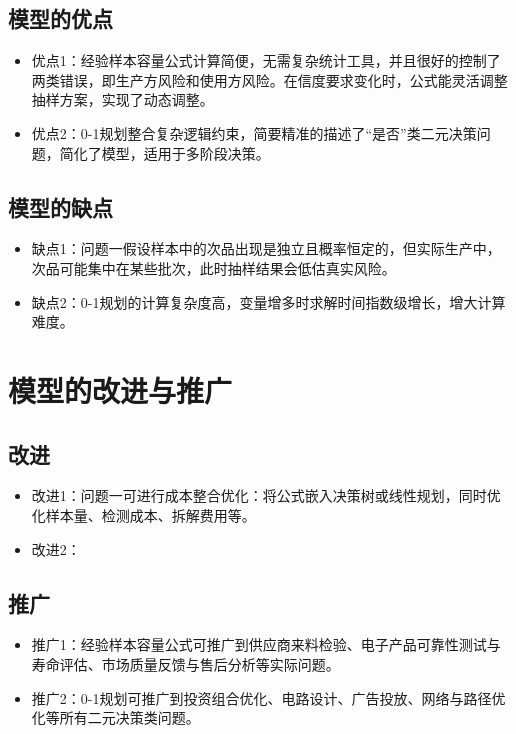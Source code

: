 \documentclass[withoutpreface,bwprint]{cumcmthesis}
\begin{document}
\subsection{模型的优点}
\begin{itemize}[itemindent=2em]
\item 优点1：经验样本容量公式计算简便，无需复杂统计工具，并且很好的控制了两类错误，即生产方风险和使用方风险。在信度要求变化时，公式能灵活调整抽样方案，实现了动态调整。

\item 优点2：0-1规划整合复杂逻辑约束，简要精准的描述了“是否”类二元决策问题，简化了模型，适用于多阶段决策。

\end{itemize}

\subsection{模型的缺点}
\begin{itemize}[itemindent=2em]
\item 缺点1：问题一假设样本中的次品出现是独立且概率恒定的，但实际生产中，次品可能集中在某些批次，此时抽样结果会低估真实风险。

\item 缺点2：0-1规划的计算复杂度高，变量增多时求解时间指数级增长，增大计算难度。


\end{itemize}

\section{模型的改进与推广}

\subsection{改进}
\begin{itemize}[itemindent=2em]
   \item 改进1：问题一可进行成本整合优化：将公式嵌入决策树或线性规划，同时优化样本量、检测成本、拆解费用等。
   \item 改进2：
\end{itemize}


\subsection{推广}
\begin{itemize}[itemindent=2em]
    \item 推广1：经验样本容量公式可推广到供应商来料检验、电子产品可靠性测试与寿命评估、市场质量反馈与售后分析等实际问题。
   \item 推广2：0-1规划可推广到投资组合优化、电路设计、广告投放、网络与路径优化等所有二元决策类问题。
\end{itemize}
\newpage
\nocite{*}
\end{document}
